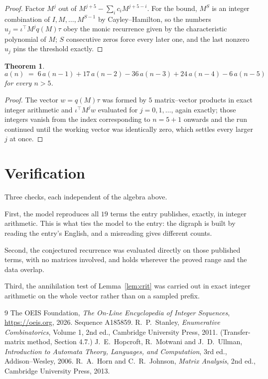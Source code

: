 \documentclass[11pt,a4paper]{article}
\theoremstyle{plain}
\newtheorem{theorem}{Theorem}
\theoremstyle{definition}
\begin{document}
\begin{proof}
Factor $M^{j}$ out of $M^{j+5}-\sum_ic_iM^{j+5-i}$. For the bound, $M^{S}$
is an integer combination of $I,M,\dots,M^{S-1}$ by Cayley--Hamilton, so the numbers
$u_j=\iota^{\!\top}M^{j}q(M)\tau$ obey the monic recurrence given by the characteristic
polynomial of $M$; $S$ consecutive zeros force every later one, and the last nonzero $u_j$
pins the threshold exactly.
\end{proof}

\begin{theorem}
\[
a(n)\;=\;6\,a(n-1) + 17\,a(n-2) - 36\,a(n-3) + 24\,a(n-4) - 6\,a(n-5)
\]
for every $n>5$.
\end{theorem}

\begin{proof}
The vector $w=q(M)\tau$ was formed by $5$ matrix--vector products in exact integer
arithmetic and $\iota^{\!\top}M^{j}w$ evaluated for $j=0,1,\dots$, again exactly; those
integers vanish from the index corresponding to $n=5+1$ onwards and the run continued
until the working vector was identically zero, which settles every larger $j$ at once.
\end{proof}

\section{Verification}

Three checks, each independent of the algebra above.

First, the model reproduces all $19$ terms the entry publishes, exactly, in integer
arithmetic. This is what ties the model to the entry: the digraph is built by reading the
entry's English, and a misreading gives different counts.

Second, the conjectured recurrence was evaluated directly on those published terms, with no
matrices involved, and holds wherever the proved range and the data overlap.

Third, the annihilation test of Lemma~\ref{lem:crit} was carried out in exact integer
arithmetic on the whole vector rather than on a sampled prefix.

\begin{thebibliography}{9}
 The OEIS Foundation, \emph{The On-Line Encyclopedia of Integer
Sequences}, \url{https://oeis.org}, 2026. Sequence A185859.
 R.~P.~Stanley, \emph{Enumerative Combinatorics}, Volume 1, 2nd ed.,
Cambridge University Press, 2011. (Transfer-matrix method, Section 4.7.)
 J.~E.~Hopcroft, R.~Motwani and J.~D.~Ullman, \emph{Introduction to Automata
Theory, Languages, and Computation}, 3rd ed., Addison--Wesley, 2006.
 R.~A.~Horn and C.~R.~Johnson, \emph{Matrix Analysis}, 2nd ed., Cambridge
University Press, 2013.
\end{thebibliography}
\end{document}
